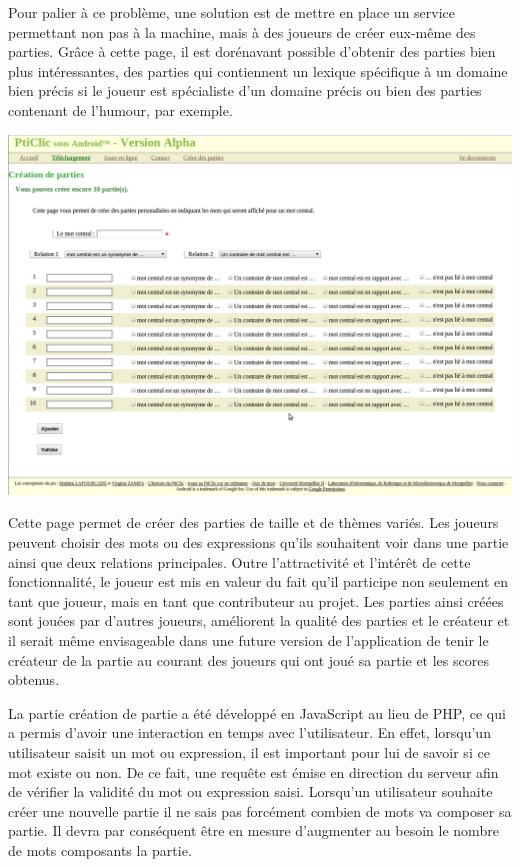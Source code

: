\documentclass[a4paper,11pt,french]{article}
\begin{document}
Pour palier à ce problème, une solution est de mettre en place un service permettant non pas à la machine, mais à des joueurs de créer eux-même des parties. Grâce à cette page, il est dorénavant possible d'obtenir des parties bien plus intéressantes, des parties qui contiennent un lexique spécifique à un domaine bien précis si le joueur est spécialiste d'un domaine précis ou bien des parties contenant de l'humour, par exemple. 


\begin{center}
\includegraphics[width=14cm]{img/siteCreerParties.png}
\end{center}

Cette page permet de créer des parties de taille et de thèmes variés. Les joueurs peuvent choisir des mots ou des expressions qu'ils souhaitent voir dans une partie ainsi que deux relations principales.
Outre l'attractivité et l'intérêt de cette fonctionnalité, le joueur est mis en valeur du fait qu'il participe non seulement en tant que joueur, mais en tant que contributeur au projet. Les parties ainsi créées sont jouées par d'autres joueurs, améliorent la qualité des parties et le créateur et il serait même envisageable dans une future version de l'application de tenir le créateur de la partie au courant des joueurs qui ont joué sa partie et les scores obtenus.

La partie création de partie a été développé en JavaScript au lieu de PHP, ce qui a permis d'avoir une interaction en temps avec l'utilisateur. En effet, lorsqu'un utilisateur saisit un mot ou expression, il est important pour lui de savoir si ce mot existe ou non. De ce fait, une requête est émise en direction du serveur afin de vérifier la validité du mot ou expression saisi. Lorsqu'un utilisateur souhaite créer une nouvelle partie 
il ne sais pas forcément combien de mots va composer sa partie. Il devra par conséquent être en mesure d'augmenter au besoin le nombre de mots composants la partie.
\end{document}
